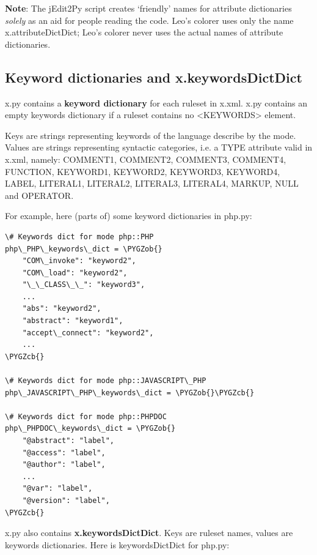 \documentclass[a4paper,10pt,english]{sphinxmanual}
\def\PYGZob{\char`\{}
\def\PYGZcb{\char`\}}
\begin{document}
\textbf{Note}:
The jEdit2Py script creates `friendly' names for attribute dictionaries \emph{solely} as an aid for people reading the code.
Leo's colorer uses only the name x.attributeDictDict;
Leo's colorer never uses the actual names of attribute dictionaries.


\subsection{Keyword dictionaries and x.keywordsDictDict}
\label{coloring:keyword-dictionaries-and-x-keywordsdictdict}
x.py contains a \textbf{keyword dictionary} for each ruleset in x.xml.
x.py contains an empty keywords dictionary if a ruleset contains no \textless{}KEYWORDS\textgreater{} element.

Keys are strings representing keywords of the language describe by the mode.
Values are strings representing syntactic categories,
i.e. a TYPE attribute valid in x.xml, namely:
COMMENT1, COMMENT2, COMMENT3, COMMENT4,
FUNCTION,
KEYWORD1, KEYWORD2, KEYWORD3, KEYWORD4,
LABEL, LITERAL1, LITERAL2, LITERAL3, LITERAL4,
MARKUP, NULL and OPERATOR.

For example, here (parts of) some keyword dictionaries in php.py:

\begin{Verbatim}[commandchars=\\\{\}]
\# Keywords dict for mode php::PHP
php\_PHP\_keywords\_dict = \PYGZob{}
    "COM\_invoke": "keyword2",
    "COM\_load": "keyword2",
    "\_\_CLASS\_\_": "keyword3",
    ...
    "abs": "keyword2",
    "abstract": "keyword1",
    "accept\_connect": "keyword2",
    ...
\PYGZcb{}

\# Keywords dict for mode php::JAVASCRIPT\_PHP
php\_JAVASCRIPT\_PHP\_keywords\_dict = \PYGZob{}\PYGZcb{}

\# Keywords dict for mode php::PHPDOC
php\_PHPDOC\_keywords\_dict = \PYGZob{}
    "@abstract": "label",
    "@access": "label",
    "@author": "label",
    ...
    "@var": "label",
    "@version": "label",
\PYGZcb{}
\end{Verbatim}

x.py also contains \textbf{x.keywordsDictDict}.
Keys are ruleset names, values are keywords dictionaries.
Here is keywordsDictDict for php.py:
\end{document}
